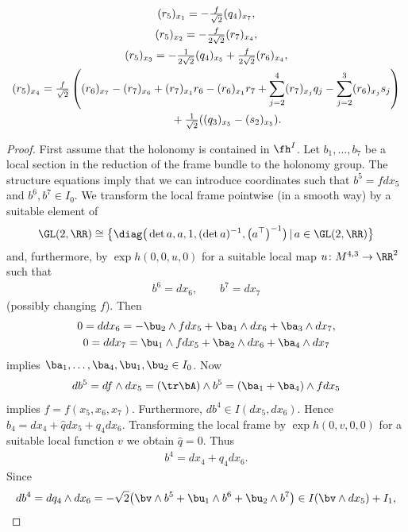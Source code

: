 \begin{Proposition}
\begin{gather}
(r_5)_{x_1}=- \tfrac f{\sqrt 2} (q_4)_{x_7}, \label{Eb6}\\
(r_5)_{x_2}=- \tfrac f{2\sqrt 2} (r_7)_{x_4}, \label{Eb7}\\
(r_5)_{x_3}=- \tfrac1{2\sqrt 2} (q_4)_{x_5}+ \tfrac f{2\sqrt 2} (r_6)_{x_4}, \label{Eb7a}\\
(r_5)_{x_4}= \tfrac f{\sqrt 2} \left( (r_6)_{x_7}-(r_7)_{x_6}+(r_7)_{x_1}r_6-(r_6)_{x_1}r_7+\sum_{j=2}^4 (r_7)_{x_j}q_j-\sum_{j=2}^3 (r_6)_{x_j}s_j\right) \nonumber\\
\hphantom{(r_5)_{x_4}=}{} + \tfrac 1{\sqrt 2} ((q_3)_{x_5}-(s_2)_{x_5}).\label{Eb10}
\end{gather}
\end{Proposition}
\begin{proof}First assume that the holonomy is contained in $\fh^I$. Let $b_1,\dots,b_7$ be a local section in the reduction of the frame bundle to the holonomy group. The structure equations imply that we can introduce coordinates such that $b^5=fdx_5$ and $b^6,b^7\in I_0$. We transform the local frame pointwise (in a smooth way) by a suitable element of \begin{gather*}\GL(2,\RR)\cong \big\{\diag\big(\det a, a,1, (\det a)^{-1}, \big(a^\top\big)^{-1}\big)\,|\, a\in\GL(2,\RR)\big\}\end{gather*} and, furthermore, by $\exp h(0,0,u,0)$ for a suitable local map $u\colon M^{4,3} \rightarrow \RR^2$ such that
\begin{gather*}b^6=dx_6,\qquad b^7=dx_7\end{gather*}
(possibly changing $f$). Then
\begin{gather*}
0 =ddx_6= -\bu_2\wedge fdx_5+\ba_1\wedge dx_6 +\ba_3\wedge dx_7,\\
0 =ddx_7= \bu_1\wedge fdx_5+\ba_2\wedge dx_6 +\ba_4\wedge dx_7
\end{gather*}
implies $\ba_1,\dots,\ba_4,\bu_1, \bu_2\in I_0$. Now
\begin{gather*}db^5=df\wedge dx_5=(\tr \bA)\wedge b^5= (\ba_1+\ba_4)\wedge fdx_5\end{gather*}
implies $f=f(x_5,x_6,x_7)$.
Furthermore, $db^4\in I(dx_5,dx_6)$. Hence $b_4=dx_4+\hat qdx_5+q_4 dx_6$. Transforming the local frame by $\exp h(0,v,0,0)$ for a suitable local function $v$ we obtain $\hat q=0$. Thus
\begin{gather*}b^4=dx_4+q_4 dx_6.\end{gather*}
Since
\begin{gather*} db^4=dq_4\wedge dx_6 =-\sqrt 2\big( \bv\wedge b^5+ \bu_1\wedge b^6 +\bu_2\wedge b^7\big)\in I(\bv\wedge dx_5)+ I_1,\end{gather*}

\end{proof}
